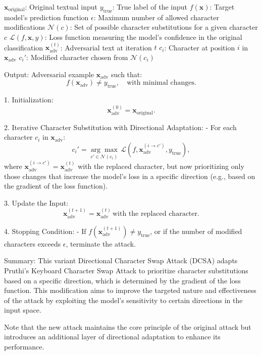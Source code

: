 $\mathbf{x}_{\text{original}}$: Original textual input  
$y_{\text{true}}$: True label of the input  
$f(\mathbf{x})$: Target model's prediction function  
$\epsilon$: Maximum number of allowed character modifications  
$\mathcal{N}(c)$: Set of possible character substitutions for a given character $c$  
$\mathcal{L}(f, \mathbf{x}, y)$: Loss function measuring the model’s confidence in the original classification  
$\mathbf{x}_{\text{adv}}^{(t)}$: Adversarial text at iteration $t$  
$c_i$: Character at position $i$ in $\mathbf{x}_{\text{adv}}$  
$c_i'$: Modified character chosen from $\mathcal{N}(c_i)$  


Output: Adversarial example $\mathbf{x}_{\text{adv}}$ such that:
\[
f(\mathbf{x}_{\text{adv}}) \neq y_{\text{true}}, \quad \text{with minimal changes}.
\]

1. Initialization:
   \[
   \mathbf{x}_{\text{adv}}^{(0)} = \mathbf{x}_{\text{original}}.
   \]

2. Iterative Character Substitution with Directional Adaptation:
   - For each character $c_i$ in $\mathbf{x}_{\text{adv}}$:
     \[
     c_i' = \underset{c' \in \mathcal{N}(c_i)}{\arg \max} \, \mathcal{L}(f, \mathbf{x}_{\text{adv}}^{(i \rightarrow c')}, y_{\text{true}}),
     \]
     where $\mathbf{x}_{\text{adv}}^{(i \rightarrow c')} = \mathbf{x}_{\text{adv}}^{(t)}$ with the replaced character, but now prioritizing only those changes that increase the model's loss in a specific direction (e.g., based on the gradient of the loss function).

3. Update the Input:
   \[
   \mathbf{x}_{\text{adv}}^{(t+1)} = \mathbf{x}_{\text{adv}}^{(t)} \, \text{with the replaced character}.
   \]

4. Stopping Condition:
   - If $f(\mathbf{x}_{\text{adv}}^{(t+1)}) \neq y_{\text{true}}$, or if the number of modified characters exceeds $\epsilon$, terminate the attack.

Summary: This variant Directional Character Swap Attack (DCSA) adapts Pruthi's Keyboard Character Swap Attack to prioritize character substitutions based on a specific direction, which is determined by the gradient of the loss function. This modification aims to improve the targeted nature and effectiveness of the attack by exploiting the model's sensitivity to certain directions in the input space.

Note that the new attack maintains the core principle of the original attack but introduces an additional layer of directional adaptation to enhance its performance.